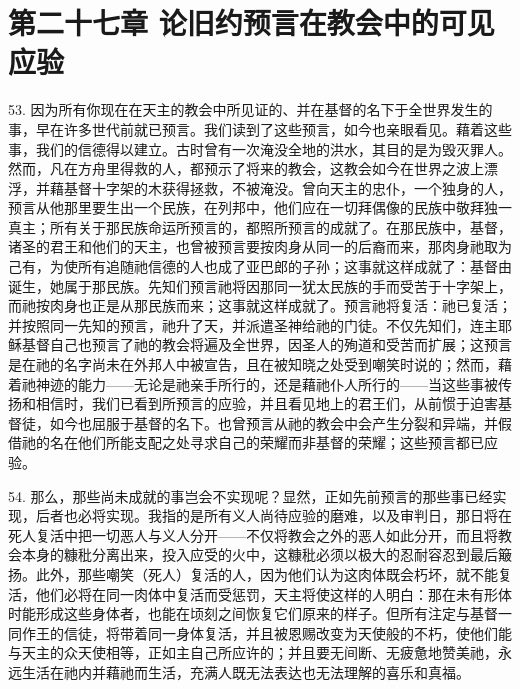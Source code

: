 
\section{第二十七章 论旧约预言在教会中的可见应验}

53. 因为所有你现在在天主的教会中所见证的、并在基督的名下于全世界发生的事，早在许多世代前就已预言。我们读到了这些预言，如今也亲眼看见。藉着这些事，我们的信德得以建立。古时曾有一次淹没全地的洪水，其目的是为毁灭罪人。然而，凡在方舟里得救的人，都预示了将来的教会，这教会如今在世界之波上漂浮，并藉基督十字架的木获得拯救，不被淹没。曾向天主的忠仆，一个独身的人，预言从他那里要生出一个民族，在列邦中，他们应在一切拜偶像的民族中敬拜独一真主；所有关于那民族命运所预言的，都照所预言的成就了。在那民族中，基督，诸圣的君王和他们的天主，也曾被预言要按肉身从同一的后裔而来，那肉身祂取为己有，为使所有追随祂信德的人也成了亚巴郎的子孙；这事就这样成就了：基督由诞生，她属于那民族。先知们预言祂将因那同一犹太民族的手而受苦于十字架上，而祂按肉身也正是从那民族而来；这事就这样成就了。预言祂将复活：祂已复活；并按照同一先知的预言，祂升了天，并派遣圣神给祂的门徒。不仅先知们，连主耶稣基督自己也预言了祂的教会将遍及全世界，因圣人的殉道和受苦而扩展；这预言是在祂的名字尚未在外邦人中被宣告，且在被知晓之处受到嘲笑时说的；然而，藉着祂神迹的能力——无论是祂亲手所行的，还是藉祂仆人所行的——当这些事被传扬和相信时，我们已看到所预言的应验，并且看见地上的君王们，从前惯于迫害基督徒，如今也屈服于基督的名下。也曾预言从祂的教会中会产生分裂和异端，并假借祂的名在他们所能支配之处寻求自己的荣耀而非基督的荣耀；这些预言都已应验。\par

54. 那么，那些尚未成就的事岂会不实现呢？显然，正如先前预言的那些事已经实现，后者也必将实现。我指的是所有义人尚待应验的磨难，以及审判日，那日将在死人复活中把一切恶人与义人分开——不仅将教会之外的恶人如此分开，而且将教会本身的糠秕分离出来，投入应受的火中，这糠秕必须以极大的忍耐容忍到最后簸扬。此外，那些嘲笑（死人）复活的人，因为他们认为这肉体既会朽坏，就不能复活，他们必将在同一肉体中复活而受惩罚，天主将使这样的人明白：那在未有形体时能形成这些身体者，也能在顷刻之间恢复它们原来的样子。但所有注定与基督一同作王的信徒，将带着同一身体复活，并且被恩赐改变为天使般的不朽，使他们能与天主的众天使相等，正如主自己所应许的；并且要无间断、无疲惫地赞美祂，永远生活在祂内并藉祂而生活，充满人既无法表达也无法理解的喜乐和真福。\par

